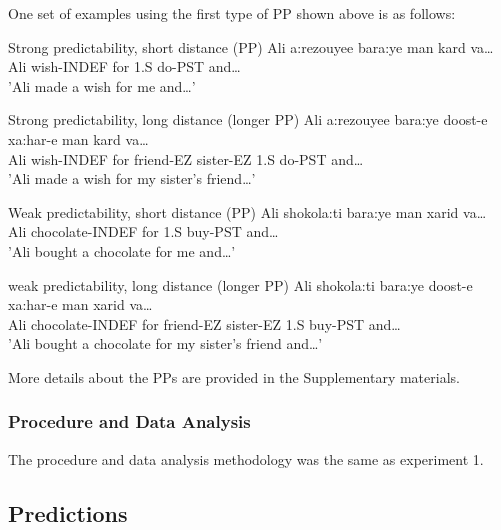 \documentclass{frontiersSCNS}\usepackage{knitr} %
\begin{document}
One set of examples using the first type of PP shown above is as follows:

\noautomath

\begin{exe}
\ex
\begin{xlist}
\item Strong predictability, short distance (PP)
\gll Ali a:rezouyee bara:ye man kard va\dots\\
Ali wish-INDEF for 1.S do-PST and\dots\\
\glt 'Ali made a wish for me and\dots'\\

\item Strong predictability, long distance (longer PP)
\gll Ali a:rezouyee bara:ye doost-e xa:har-e man kard va\dots\\
Ali wish-INDEF for friend-EZ sister-EZ 1.S do-PST and\dots\\
\glt 'Ali made a wish for my sister's friend\dots'\\
    
\item Weak predictability, short distance (PP)
\gll Ali shokola:ti bara:ye man xarid va\dots\\
Ali chocolate-INDEF for 1.S buy-PST and\dots\\
\glt 'Ali bought a chocolate for me and\dots'\\
    
\item weak predictability, long distance (longer PP)
\gll Ali shokola:ti bara:ye doost-e xa:har-e man xarid va\dots\\
Ali chocolate-INDEF for friend-EZ sister-EZ 1.S buy-PST and\dots\\
\glt 'Ali bought a chocolate for my sister's friend and\dots'\\
\end{xlist}
\end{exe}

More details about the PPs are provided in the Supplementary materials.

\subsubsection{Procedure and Data Analysis}

The procedure and data analysis methodology was the same as experiment 1.

 \subsection{Predictions}
\end{document}
